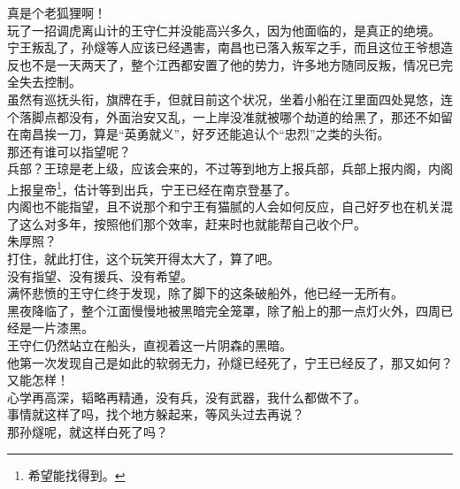 \begin{multicols}{\theparacolNo}
真是个老狐狸啊！\\

玩了一招调虎离山计的王守仁并没能高兴多久，因为他面临的，是真正的绝境。\\

宁王叛乱了，孙燧等人应该已经遇害，南昌也已落入叛军之手，而且这位王爷想造反也不是一天两天了，整个江西都安置了他的势力，许多地方随同反叛，情况已完全失去控制。\\

虽然有巡抚头衔，旗牌在手，但就目前这个状况，坐着小船在江里面四处晃悠，连个落脚点都没有，外面治安又乱，一上岸没准就被哪个劫道的给黑了，那还不如留在南昌挨一刀，算是“英勇就义”，好歹还能追认个“忠烈”之类的头衔。\\

那还有谁可以指望呢？\\

兵部？王琼是老上级，应该会来的，不过等到地方上报兵部，兵部上报内阁，内阁上报皇帝\footnote{希望能找得到。}，估计等到出兵，宁王已经在南京登基了。\\

内阁也不能指望，且不说那个和宁王有猫腻的人会如何反应，自己好歹也在机关混了这么对多年，按照他们那个效率，赶来时也就能帮自己收个尸。\\

朱厚照？\\

打住，就此打住，这个玩笑开得太大了，算了吧。\\

没有指望、没有援兵、没有希望。\\

满怀悲愤的王守仁终于发现，除了脚下的这条破船外，他已经一无所有。\\

黑夜降临了，整个江面慢慢地被黑暗完全笼罩，除了船上的那一点灯火外，四周已经是一片漆黑。\\

王守仁仍然站立在船头，直视着这一片阴森的黑暗。\\

他第一次发现自己是如此的软弱无力，孙燧已经死了，宁王已经反了，那又如何？又能怎样！\\

心学再高深，韬略再精通，没有兵，没有武器，我什么都做不了。\\

事情就这样了吗，找个地方躲起来，等风头过去再说？\\

那孙燧呢，就这样白死了吗？\\


\end{multicols}
